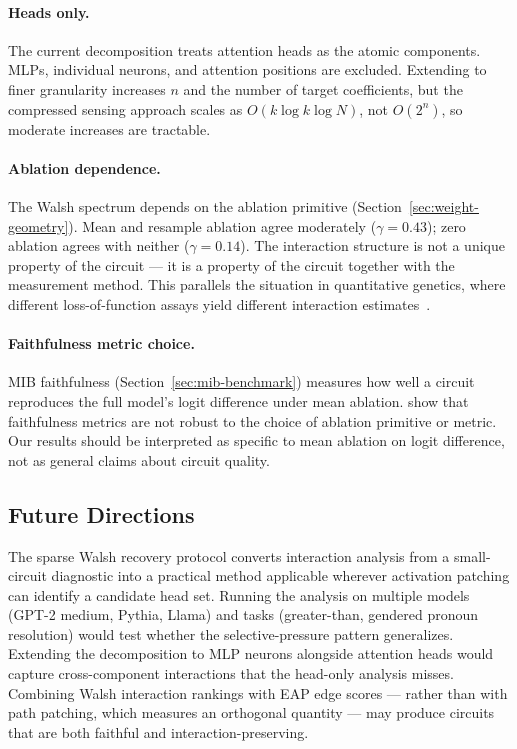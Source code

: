 \documentclass{article}
\begin{document}
\paragraph{Heads only.}

The current decomposition treats attention heads as the atomic
components. MLPs, individual neurons, and attention positions are
excluded. Extending to finer granularity increases $n$ and the number
of target coefficients, but the compressed sensing approach scales
as $O(k \log k \log N)$, not $O(2^n)$, so moderate increases are
tractable.

\paragraph{Ablation dependence.}

The Walsh spectrum depends on the ablation primitive
(Section~\ref{sec:weight-geometry}). Mean and resample ablation agree
moderately ($\gamma = 0.43$); zero ablation agrees with neither
($\gamma = 0.14$). The interaction structure is not a unique property
of the circuit --- it is a property of the circuit together with the
measurement method. This parallels the situation in quantitative
genetics, where different loss-of-function assays yield different
interaction
estimates~\citep{housden2017comparison,fluidity2024elife}.

\paragraph{Faithfulness metric choice.}

MIB faithfulness (Section~\ref{sec:mib-benchmark}) measures how well a
circuit reproduces the full model's logit difference under mean ablation.
\citet{miller2024transformer} show that faithfulness metrics are not
robust to the choice of ablation primitive or metric. Our results should
be interpreted as specific to mean ablation on logit difference, not as
general claims about circuit quality.

\subsection{Future Directions}

The sparse Walsh recovery protocol converts interaction analysis from a
small-circuit diagnostic into a practical method applicable wherever
activation patching can identify a candidate head set. Running the
analysis on multiple models (GPT-2 medium, Pythia, Llama) and tasks
(greater-than, gendered pronoun resolution) would test whether the
selective-pressure pattern generalizes. Extending the decomposition to
MLP neurons alongside attention heads would capture cross-component
interactions that the head-only analysis misses. Combining Walsh
interaction rankings with EAP edge scores --- rather than with path
patching, which measures an orthogonal quantity --- may produce circuits
that are both faithful and interaction-preserving.




\end{document}
